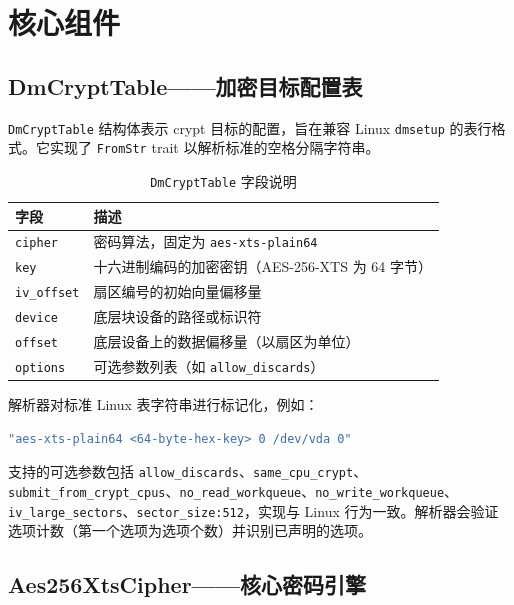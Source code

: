 \section{核心组件}

\subsection{DmCryptTable——加密目标配置表}

\texttt{DmCryptTable} 结构体表示 crypt 目标的配置，旨在兼容 Linux \texttt{dmsetup} 的表行格式。它实现了 \texttt{FromStr} trait 以解析标准的空格分隔字符串。

\begin{table}[H]
    \centering
    \caption{\texttt{DmCryptTable} 字段说明}
    \label{tab:dmcrypt_table}
    \begin{tabular}{p{}p{}}
        \toprule
        \textbf{字段} & \textbf{描述} \\
        \midrule
        \texttt{cipher} & 密码算法，固定为 \texttt{aes-xts-plain64} \\
        \texttt{key} & 十六进制编码的加密密钥（AES-256-XTS 为 64 字节） \\
        \texttt{iv\_offset} & 扇区编号的初始向量偏移量 \\
        \texttt{device} & 底层块设备的路径或标识符 \\
        \texttt{offset} & 底层设备上的数据偏移量（以扇区为单位） \\
        \texttt{options} & 可选参数列表（如 \texttt{allow\_discards}） \\
        \bottomrule
    \end{tabular}
\end{table}

解析器对标准 Linux 表字符串进行标记化，例如：
\begin{lstlisting}[language=Rust, basicstyle=\ttfamily\small]
"aes-xts-plain64 <64-byte-hex-key> 0 /dev/vda 0"
\end{lstlisting}

支持的可选参数包括 \texttt{allow\_discards}、\texttt{same\_cpu\_crypt}、\texttt{submit\_from\_crypt\_cpus}、\texttt{no\_read\_workqueue}、\texttt{no\_write\_workqueue}、\texttt{iv\_large\_sectors}、\texttt{sector\_size:512}，实现与 Linux 行为一致。解析器会验证选项计数（第一个选项为选项个数）并识别已声明的选项。

\subsection{Aes256\allowbreak XtsCipher——核心密码引擎}

